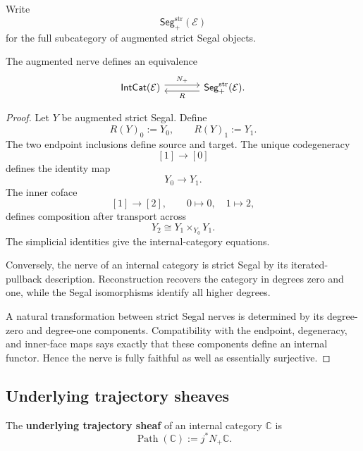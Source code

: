 Write
\[
    \mathsf{Seg}^{\mathrm{str}}_+(\mathcal E)
\]
for the full subcategory of augmented strict Segal objects.

\begin{theorem}
\label{thm:internal-nerve-equivalence}
The augmented nerve defines an equivalence
\[
\begin{tikzcd}[column sep=large]
    \mathsf{IntCat}(\mathcal E)
        \arrow[r, shift left=0.7ex, "N_+"]
    &
    \mathsf{Seg}^{\mathrm{str}}_+(\mathcal E)
        \arrow[l, shift left=0.7ex, "R"] .
\end{tikzcd}
\]
\end{theorem}

\begin{proof}
Let \(Y\) be augmented strict Segal. Define
\[
    R(Y)_0:=Y_0,
    \qquad
    R(Y)_1:=Y_1.
\]
The two endpoint inclusions define source and target. The unique codegeneracy
\[
    [1]\to[0]
\]
defines the identity map
\[
    Y_0\to Y_1.
\]
The inner coface
\[
    [1]\to[2],
    \qquad
    0\mapsto0,
    \quad
    1\mapsto2,
\]
defines composition after transport across
\[
    Y_2
    \cong
    Y_1\times_{Y_0}Y_1.
\]
The simplicial identities give the internal-category equations.

Conversely, the nerve of an internal category is strict Segal by its
iterated-pullback description. Reconstruction recovers the category in
degrees zero and one, while the Segal isomorphisms identify all higher
degrees.

A natural transformation between strict Segal nerves is determined by its
degree-zero and degree-one components. Compatibility with the endpoint,
degeneracy, and inner-face maps says exactly that these components define an
internal functor. Hence the nerve is fully faithful as well as essentially
surjective.
\end{proof}

\subsection{Underlying trajectory sheaves}
\label{subsec:underlying-trajectory-sheaves}

\begin{definition}
\label{def:underlying-trajectory-sheaf}
The \textbf{underlying trajectory sheaf} of an internal category
\(\mathbb C\) is
\[
    \operatorname{Path}(\mathbb C)
    :=
    j^\ast N_+\mathbb C.
\]
\end{definition}

